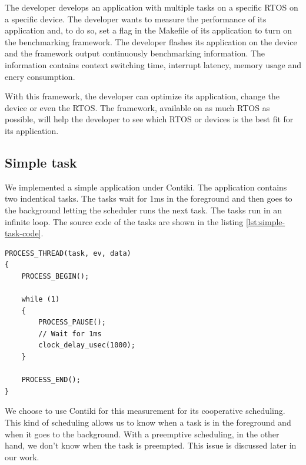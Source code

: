 The developer develops an application with multiple tasks on a specific RTOS on a specific device.
The developer wants to measure the performance of its application and, to do so, set a flag in the Makefile of its application to turn on the benchmarking framework.
The developer flashes its application on the device and the framework output continuously benchmarking information.
The information contains context switching time, interrupt latency, memory usage and enery consumption.

With this framework, the developer can optimize its application, change the device or even the RTOS.
The framework, available on as much RTOS as possible, will help the developer to see which RTOS or devices is the best fit for its application.

\subsection{Simple task}
We implemented a simple application under Contiki.
The application contains two indentical tasks.
The tasks wait for 1ms in the foreground and then goes to the background letting the scheduler runs the next task.
The tasks run in an infinite loop.
The source code of the tasks are shown in the listing \ref{lst:simple-task-code}.

\begin{lstlisting}[style=CStyle, label={lst:simple-task-code}, caption={Source code of the simple task implemented in Contiki}]
PROCESS_THREAD(task, ev, data)
{
    PROCESS_BEGIN();

    while (1)
    {
        PROCESS_PAUSE();
        // Wait for 1ms
        clock_delay_usec(1000);
    }

    PROCESS_END();
}
\end{lstlisting}


We choose to use Contiki for this measurement for its cooperative scheduling.
This kind of scheduling allows us to know when a task is in the foreground and when it goes to the background.
With a preemptive scheduling, in the other hand, we don't know when the task is preempted.
This issue is discussed later in our work.